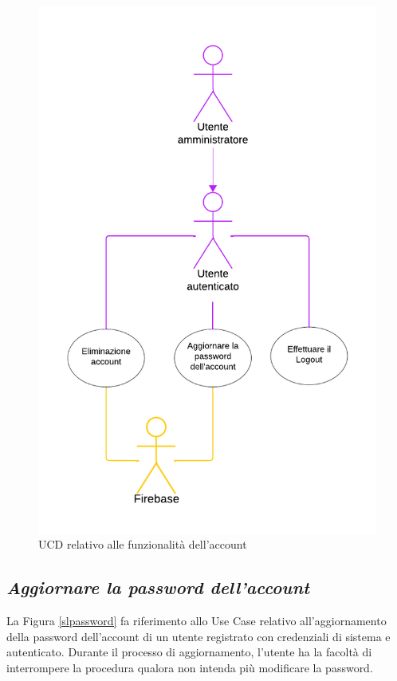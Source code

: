 \documentclass[11pt, a4paper]{article}
\theoremstyle{definition} %
\begin{document}
\begin{figure}[H]
\centering
\includegraphics[scale = 0.88]{materiale/ucdiagrams/ucaccount.pdf}
\caption{UCD relativo alle funzionalità dell'account}
\label{accountfig}
\end{figure}



\newpage
\subsection*{\textit{Aggiornare la password dell'account}}
La Figura \ref{slpassword} fa riferimento allo Use Case relativo all'aggiornamento
della password dell'account di un utente registrato con credenziali di sistema e autenticato.
Durante il processo di aggiornamento, l'utente ha la facoltà di interrompere
la procedura qualora non intenda più modificare la password.
\end{document}
